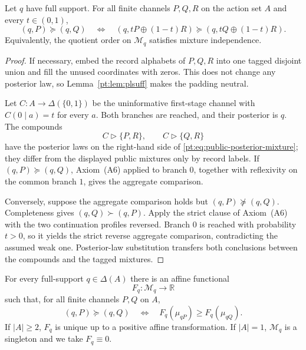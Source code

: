 \begin{lemma}\label{pt:lem:publiccoin}
Let $q$ have full support.  For all finite channels $P,Q,R$ on the action set
$A$ and every $t\in(0,1)$,
\[
 (q,P)\succeq(q,Q)
 \quad\Longleftrightarrow\quad
 (q,tP\oplus(1-t)R)
 \succeq
 (q,tQ\oplus(1-t)R).
\]
Equivalently, the quotient order on $\mathcal M_q$ satisfies mixture
independence.
\end{lemma}

\begin{proof}
If necessary, embed the record alphabets of $P,Q,R$ into one tagged disjoint
union and fill the unused coordinates with zeros.  This does not change any
posterior law, so Lemma~\ref{pt:lem:plsuff} makes the padding neutral.

Let $C:A\to\Delta(\{0,1\})$ be the uninformative first-stage channel with
$C(0\mid a)=t$ for every $a$.  Both branches are reached, and their posterior
is $q$.  The compounds
\[
 C\triangleright\{P,R\},
 \qquad
 C\triangleright\{Q,R\}
\]
have the posterior laws on the right-hand side of
\eqref{pt:eq:public-posterior-mixture}; they differ from the displayed public
mixtures only by record labels.  If $(q,P)\succeq(q,Q)$, Axiom~\textup{(A6)}
applied to branch $0$, together with reflexivity on the common branch $1$,
gives the aggregate comparison.

Conversely, suppose the aggregate comparison holds but
$(q,P)\not\succeq(q,Q)$.  Completeness gives $(q,Q)\succ(q,P)$.  Apply the
strict clause of Axiom~\textup{(A6)} with the two continuation profiles
reversed.  Branch $0$ is reached with probability $t>0$, so it yields the
strict reverse aggregate comparison, contradicting the assumed weak one.
Posterior-law substitution transfers both conclusions between the compounds
and the tagged mixtures.
\end{proof}

\begin{lemma}\label{pt:lem:postsep}
For every full-support $q\in\Delta(A)$ there is an affine functional
\[
 F_q:\mathcal M_q\longrightarrow\mathbb R
\]
such that, for all finite channels $P,Q$ on $A$,
\begin{equation}
 (q,P)\succeq(q,Q)
 \quad\Longleftrightarrow\quad
 F_q(\mu_{qP})\ge F_q(\mu_{qQ}).
 \label{pt:eq:fibre-representation}
\end{equation}
If $|A|\ge2$, $F_q$ is unique up to a positive affine transformation.  If
$|A|=1$, $\mathcal M_q$ is a singleton and we take $F_q\equiv0$.
\end{lemma}

